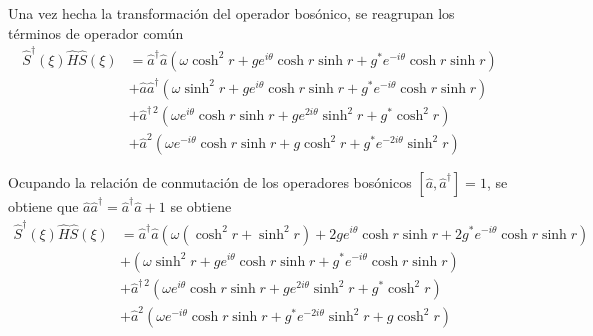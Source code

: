 Una vez hecha la transformación del operador bosónico, se reagrupan los términos de operador común
\begin{align*}
  \hat{S}^{\dagger}(\xi) \hat{H} \hat{S}(\xi)
   & = \hat{a}^{\dagger} \hat{a} \left( \omega \cosh^2 {r} + ge^{i\theta}\cosh{r}\sinh{r} + g^{*}e^{-i\theta}\cosh{r}\sinh{r} \right) \\
   & + \hat{a} \hat{a}^{\dagger} \left( \omega \sinh^2 {r} + ge^{i\theta}\cosh{r}\sinh{r} + g^{*}e^{-i\theta}\cosh{r}\sinh{r} \right) \\
   & + \hat{a}^{\dagger\,2} (\omega e^{i\theta} \cosh{r}\sinh{r} + g e^{2i\theta}\sinh^2{r} + g^{*}\cosh^2 {r})                       \\
   & + \hat{a}^{2} (\omega e^{-i\theta} \cosh{r}\sinh{r} + g \cosh^2{r} + g^{*} e^{-2i\theta} \sinh^2 {r})
\end{align*}

Ocupando la relación de conmutación de los operadores bosónicos $\left[\hat{a}, \hat{a}^{\dagger}\right] = 1$, se obtiene que $\hat{a}\hat{a}^{\dagger} = \hat{a}^{\dagger}\hat{a}+1$ se obtiene
\begin{align*}
  \hat{S}^{\dagger}(\xi) \hat{H} \hat{S}(\xi)
   & = \hat{a}^{\dagger} \hat{a} \left( \omega (\cosh^2 {r} + \sinh^2 {r}) + 2ge^{i\theta}\cosh{r}\sinh{r} + 2g^{*}e^{-i\theta}\cosh{r}\sinh{r} \right) \\
   & + \left( \omega \sinh^2 {r} + ge^{i\theta}\cosh{r}\sinh{r} + g^{*}e^{-i\theta}\cosh{r}\sinh{r} \right)                                             \\
   & + \hat{a}^{\dagger\,2} (\omega e^{i\theta} \cosh{r}\sinh{r} + g e^{2i\theta}\sinh^2{r} + g^{*}\cosh^2 {r})                                         \\
   & + \hat{a}^{2} (\omega e^{-i\theta} \cosh{r}\sinh{r} + g^{*} e^{-2i\theta} \sinh^2 {r} + g \cosh^2{r})
\end{align*}

